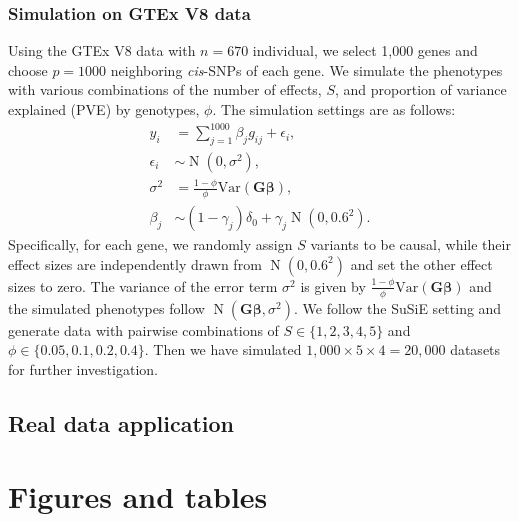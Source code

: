 \documentclass[pdflatex,sn-mathphys-num]{sn-jnl}%
\theoremstyle{thmstyleone}%
\theoremstyle{thmstyletwo}%
\theoremstyle{thmstylethree}%
\begin{document}
\subsubsection{Simulation on GTEx V8 data}
Using the GTEx V8 data \cite{gtex2015genotype} with $n=670$ individual, we select 1,000 genes and choose $p=1000$ neighboring \textit{cis}-SNPs of each gene. We simulate the phenotypes with various combinations of the number of effects, $S$, and proportion of variance explained (PVE) by genotypes, $\phi$. The simulation settings are as follows:
\begin{align}
    y_i &= \sum_{j=1}^{1000} \beta_j g_{ij}  + \epsilon_i,\\
    \epsilon_i &\sim \operatorname{N}(0, \sigma^2),\\
    \sigma^2 &= \frac{1-\phi}{\phi}\text{Var}(\mathbf{G}\boldsymbol{\beta}),\\
    \beta_j  &\sim (1-\gamma_j)\delta_0 + \gamma_j\operatorname{N}\left(0, 0.6^2\right).
\end{align}
Specifically, for each gene, we randomly assign $S$ variants to be causal, while their effect sizes are independently drawn from $\operatorname{N}(0, 0.6^2)$ and set the other effect sizes to zero. The variance of the error term $\sigma^2$ is given by $\frac{1-\phi}{\phi}\text{Var}(\mathbf{G}\boldsymbol{\beta})$ and the simulated phenotypes follow $\operatorname{N}(\mathbf{G}\boldsymbol{\beta}, \sigma^2)$. We follow the SuSiE setting and generate data with pairwise combinations of $S \in \{1,2,3,4,5\}$ and $\phi \in \{0.05,0.1,0.2,0.4\}$. Then we have simulated $1,000\times 5 \times 4 = 20,000$ datasets for further investigation.



\subsection{Real data application}\label{subsec3}





\newpage
\section{Figures and tables}\label{sec6}





\newpage

\end{document}

